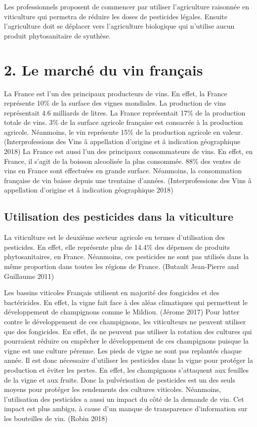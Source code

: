 \documentclass[11pt,]{article}
\begin{document}
Les professionnels proposent de commencer par utiliser l'agriculture
raisonnée en viticulture qui permetra de réduire les doses de pesticides
légales. Ensuite l'agriculture doit se déplacer vers l'agriculture
biologique qui n'utilise aucun produit phytosanitaire de synthèse.

\hypertarget{le-marche-du-vin-francais}{%
\section{2. Le marché du vin français}\label{le-marche-du-vin-francais}}

La France est l'un des principaux producteurs de vins. En effet, la
France représente 10\% de la surface des vignes mondiales. La production
de vins représentait 4.6 milliards de litres. La France représentait
17\% de la production totale de vins. 3\% de la surface agricole
française est consacrée à la production agricole. Néanmoins, le vin
représente 15\% de la production agricole en valeur. (Interprofessions
des Vins â appellation d'origine et â indication géographique 2018) La
France est aussi l'un des principaux consommateurs de vins. En effet, en
France, il s'agit de la boisson alcoolisée la plus consommée. 88\% des
ventes de vins en France sont effectuées en grande surface. Néanmoins,
la consommation française de vin baisse depuis une trentaine d'années.
(Interprofessions des Vins â appellation d'origine et â indication
géographique 2018)

\hypertarget{utilisation-des-pesticides-dans-la-viticulture}{%
\subsection{Utilisation des pesticides dans la
viticulture}\label{utilisation-des-pesticides-dans-la-viticulture}}

La viticulture est le deuxième secteur agricole en termes d'utilisation
des pesticides. En effet, elle représente plus de 14.4\% des dépenses de
produits phytosanitaires, en France. Néanmoins, ces pesticides ne sont
pas utilisés dans la même proportion dans toutes les régions de France.
(Butault Jean-Pierre and Guillaume 2011)

Les bassins viticoles Français utilisent en majorité des fongicides et
des bactéricides. En effet, la vigne fait face à des aléas climatiques
qui permettent le développement de champignons comme le Mildiou. (Jérome
2017) Pour lutter contre le développement de ces champignons, les
viticulteurs ne peuvent utiliser que des fongicides. En effet, ils ne
peuvent pas utiliser la rotation des cultures qui pourraient réduire ou
empêcher le développement de ces champignons puisque la vigne est une
culture pérenne. Les pieds de vigne ne sont pas replantés chaque année.
Il est donc nécessaire d'utiliser les pesticides dans la vigne pour
protéger la production et éviter les pertes. En effet, les champignons
s'attaquent aux feuilles de la vigne et aux fruits. Donc la
pulvérisation de pesticides est un des seuls moyens pour protéger les
rendements des cultures viticoles. Néanmoins, l'utilisation des
pesticides a aussi un impact du côté de la demande de vin. Cet impact
est plus ambigu, à cause d'un manque de transparence d'information sur
les bouteilles de vin. (Robin 2018)
\end{document}
